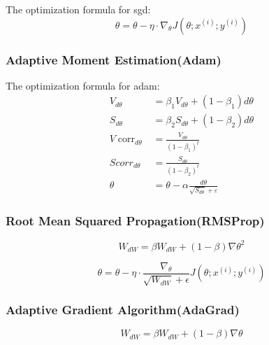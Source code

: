   The optimization formula for \acrfull{sgd}:
  \begin{equation}
    \theta = \theta - \eta \cdot \nabla_\theta J( \theta; x^{(i)}; y^{(i)})
  \end{equation}

  \subsubsection{Adaptive Moment Estimation(Adam)}

  The optimization formula for \acrfull{adam}:
  \begin{equation}
  \begin{aligned} V _ { d \theta } & = \beta _ { 1 } V _ { d \theta } + \left( 1 - \beta _ { 1 } \right) d \theta \\ S _ { d \theta } & = \beta _ { 2 } S _ { d \theta } + \left( 1 - \beta _ { 2 } \right) d \theta \\ V \operatorname { corr } _ { d \theta } & = \frac { V _ { d \theta } } { \left( 1 - \beta _ { 1 } \right) ^ { t } } \\ S c o r r _ { d \theta } & = \frac { S _ { d \theta } } { \left( 1 - \beta _ { 2 } \right) ^ { t } } \\ \theta & = \theta - \alpha \frac { d \theta } { \sqrt { S _ { d \theta } } + \varepsilon } \end{aligned}
  \end{equation}

  \subsubsection{Root Mean Squared Propagation(RMSProp)}

  \begin{equation}
    W_{dW} = \beta{W_{dW}} + (1-\beta) {\nabla\theta}^{2}
  \end{equation}

  \begin{equation}
    \theta = \theta - \eta \cdot \frac{\nabla_\theta}{\sqrt{W_{dW}} + \epsilon}  J( \theta; x^{(i)}; y^{(i)})
  \end{equation}


  \subsubsection{Adaptive Gradient Algorithm(AdaGrad)}
  
  \begin{equation}
    W_{dW} = \beta{W_{dW}} + (1-\beta) {\nabla\theta}
  \end{equation}

